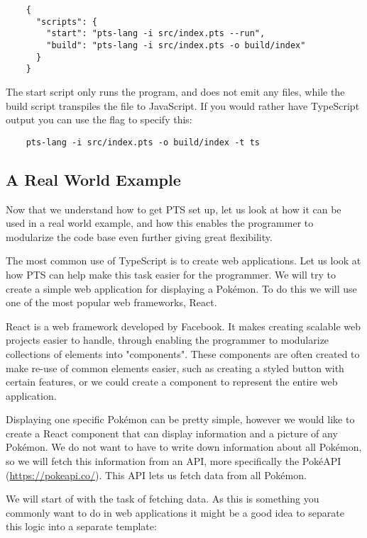 \begin{verbatim}
    {
      "scripts": {
        "start": "pts-lang -i src/index.pts --run",
        "build": "pts-lang -i src/index.pts -o build/index"
      }
    }
\end{verbatim}

The start script only runs the program, and does not emit any files, while the build script transpiles the  file to JavaScript.
If you would rather have TypeScript output you can use the  flag to specify this:

\begin{verbatim}
    pts-lang -i src/index.pts -o build/index -t ts
\end{verbatim}

\subsection{A Real World Example}\label{subsec:a-real-world-example}

Now that we understand how to get PTS set up, let us look at how it can be used in a real world example, and how this enables the programmer to modularize the code base even further giving great flexibility.

The most common use of TypeScript is to create web applications.
Let us look at how PTS can help make this task easier for the programmer.
We will try to create a simple web application for displaying a Pokémon.
To do this we will use one of the most popular web frameworks, React.

React is a web framework developed by Facebook.
It makes creating scalable web projects easier to handle, through enabling the programmer to modularize collections of elements into "components".
These components are often created to make re-use of common elements easier, such as creating a styled button with certain features, or we could create a component to represent the entire web application.

Displaying one specific Pokémon can be pretty simple, however we would like to create a React component that can display information and a picture of any Pokémon.
We do not want to have to write down information about all Pokémon, so we will fetch this information from an API, more specifically the PokéAPI (\url{https://pokeapi.co/}).
This API lets us fetch data from all Pokémon.

We will start of with the task of fetching data.
As this is something you commonly want to do in web applications it might be a good idea to separate this logic into a separate template:

